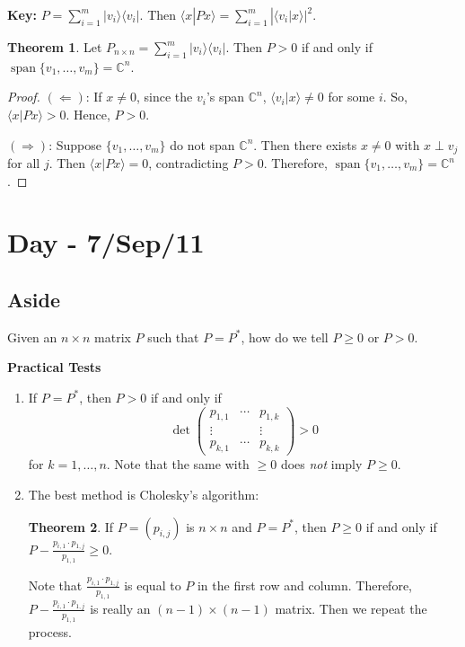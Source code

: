 \documentclass[12pt]{article}
\theoremstyle{definition}
\newtheorem*{theorem}{Theorem}
\newcommand{\braket}[2]{\langle #1|#2\rangle}
\newcommand{\ketbra}[2]{|#1\rangle\langle #2|}
\newcommand{\C}{\mathbb{C}}
\begin{document}
\textbf{Key:} $P = \sum_{i=1}^m \ketbra{v_i}{v_i}$. Then $\braket{x}{Px} = \sum_{i=1}^m |\braket{v_i}{x}|^2$.

\begin{theorem}
Let $P_{n\times n} = \sum_{i=1}^m \ketbra{v_i}{v_i}$. Then $P > 0$ if and only if $\operatorname{span}\{v_1,\ldots,v_m\} = \C^n$.
\end{theorem}

\begin{proof}
$(\Leftarrow)$: If $x \neq 0$, since the $v_i$'s span $\C^n$, $\braket{v_i}{x} \neq 0$ for some $i$. So, $\braket{x}{Px} > 0$. Hence, $P > 0$.

$(\Rightarrow)$: Suppose $\{v_1,\ldots,v_m\}$ do not span $\C^n$. Then there exists $x \neq 0$ with $x \perp v_j$ for all $j$. Then $\braket{x}{Px} = 0$, contradicting $P > 0$. Therefore, $\operatorname{span}\{v_1,\ldots,v_m\} = \C^n$.
\end{proof}

\section{Day - 7/Sep/11}

\subsection{Aside}

Given an $n \times n$ matrix $P$ such that $P = P^*$, how do we tell $P \geq 0$ or $P > 0$.

\textbf{Practical Tests}

\begin{enumerate}
\item If $P = P^*$, then $P > 0$ if and only if
\[
\det\begin{pmatrix} p_{1,1} & \cdots & p_{1,k} \\ \vdots & & \vdots \\ p_{k,1} & \cdots & p_{k,k} \end{pmatrix} > 0
\]
for $k = 1,\ldots,n$. Note that the same with $\geq 0$ does \emph{not} imply $P \geq 0$.

\item The best method is Cholesky's algorithm:
\begin{theorem}
If $P = (p_{i,j})$ is $n \times n$ and $P = P^*$, then $P \geq 0$ if and only if $P - \frac{p_{i,1} \cdot p_{1,j}}{p_{1,1}} \geq 0$.
\end{theorem}

Note that $\frac{p_{i,1} \cdot p_{1,j}}{p_{1,1}}$ is equal to $P$ in the first row and column. Therefore, $P - \frac{p_{i,1} \cdot p_{1,j}}{p_{1,1}}$ is really an $(n-1) \times (n-1)$ matrix. Then we repeat the process.
\end{enumerate}
\end{document}
